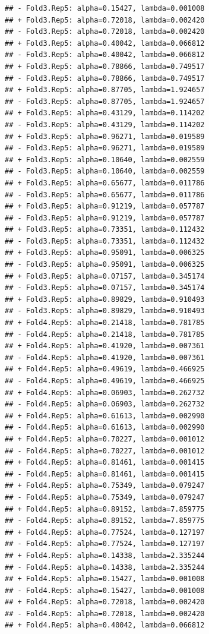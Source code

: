 \documentclass[
]{article}
\begin{document}
\begin{verbatim}
## - Fold3.Rep5: alpha=0.15427, lambda=0.001008 
## + Fold3.Rep5: alpha=0.72018, lambda=0.002420 
## - Fold3.Rep5: alpha=0.72018, lambda=0.002420 
## + Fold3.Rep5: alpha=0.40042, lambda=0.066812 
## - Fold3.Rep5: alpha=0.40042, lambda=0.066812 
## + Fold3.Rep5: alpha=0.78866, lambda=0.749517 
## - Fold3.Rep5: alpha=0.78866, lambda=0.749517 
## + Fold3.Rep5: alpha=0.87705, lambda=1.924657 
## - Fold3.Rep5: alpha=0.87705, lambda=1.924657 
## + Fold3.Rep5: alpha=0.43129, lambda=0.114202 
## - Fold3.Rep5: alpha=0.43129, lambda=0.114202 
## + Fold3.Rep5: alpha=0.96271, lambda=0.019589 
## - Fold3.Rep5: alpha=0.96271, lambda=0.019589 
## + Fold3.Rep5: alpha=0.10640, lambda=0.002559 
## - Fold3.Rep5: alpha=0.10640, lambda=0.002559 
## + Fold3.Rep5: alpha=0.65677, lambda=0.011786 
## - Fold3.Rep5: alpha=0.65677, lambda=0.011786 
## + Fold3.Rep5: alpha=0.91219, lambda=0.057787 
## - Fold3.Rep5: alpha=0.91219, lambda=0.057787 
## + Fold3.Rep5: alpha=0.73351, lambda=0.112432 
## - Fold3.Rep5: alpha=0.73351, lambda=0.112432 
## + Fold3.Rep5: alpha=0.95091, lambda=0.006325 
## - Fold3.Rep5: alpha=0.95091, lambda=0.006325 
## + Fold3.Rep5: alpha=0.07157, lambda=0.345174 
## - Fold3.Rep5: alpha=0.07157, lambda=0.345174 
## + Fold3.Rep5: alpha=0.89829, lambda=0.910493 
## - Fold3.Rep5: alpha=0.89829, lambda=0.910493 
## + Fold4.Rep5: alpha=0.21418, lambda=0.781785 
## - Fold4.Rep5: alpha=0.21418, lambda=0.781785 
## + Fold4.Rep5: alpha=0.41920, lambda=0.007361 
## - Fold4.Rep5: alpha=0.41920, lambda=0.007361 
## + Fold4.Rep5: alpha=0.49619, lambda=0.466925 
## - Fold4.Rep5: alpha=0.49619, lambda=0.466925 
## + Fold4.Rep5: alpha=0.06903, lambda=0.262732 
## - Fold4.Rep5: alpha=0.06903, lambda=0.262732 
## + Fold4.Rep5: alpha=0.61613, lambda=0.002990 
## - Fold4.Rep5: alpha=0.61613, lambda=0.002990 
## + Fold4.Rep5: alpha=0.70227, lambda=0.001012 
## - Fold4.Rep5: alpha=0.70227, lambda=0.001012 
## + Fold4.Rep5: alpha=0.81461, lambda=0.001415 
## - Fold4.Rep5: alpha=0.81461, lambda=0.001415 
## + Fold4.Rep5: alpha=0.75349, lambda=0.079247 
## - Fold4.Rep5: alpha=0.75349, lambda=0.079247 
## + Fold4.Rep5: alpha=0.89152, lambda=7.859775 
## - Fold4.Rep5: alpha=0.89152, lambda=7.859775 
## + Fold4.Rep5: alpha=0.77524, lambda=0.127197 
## - Fold4.Rep5: alpha=0.77524, lambda=0.127197 
## + Fold4.Rep5: alpha=0.14338, lambda=2.335244 
## - Fold4.Rep5: alpha=0.14338, lambda=2.335244 
## + Fold4.Rep5: alpha=0.15427, lambda=0.001008 
## - Fold4.Rep5: alpha=0.15427, lambda=0.001008 
## + Fold4.Rep5: alpha=0.72018, lambda=0.002420 
## - Fold4.Rep5: alpha=0.72018, lambda=0.002420 
## + Fold4.Rep5: alpha=0.40042, lambda=0.066812 

\end{verbatim}
\end{document}
